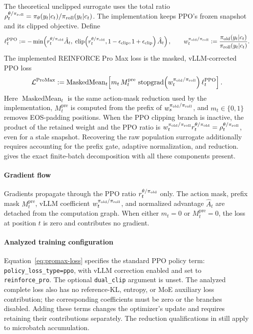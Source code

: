 The theoretical unclipped surrogate uses the total ratio
$\rho_t^{\theta/\pi_{\mathrm{roll}}}=\pi_{\theta}(y_t|c_t)/\pi_{\mathrm{roll}}(y_t|c_t)$. The
implementation keeps PPO's frozen snapshot and its clipped objective. Define
\begin{equation*}
    \ell_t^{\mathrm{PPO}}
    :=
    -\min\!\left(
        r_t^{\theta/\pi_{\mathrm{old}}}\hat A_t,\;
        \operatorname{clip}\!\left(r_t^{\theta/\pi_{\mathrm{old}}},
        1-\epsilon_{\mathrm{clip}},1+\epsilon_{\mathrm{clip}}\right)\hat A_t
    \right),
    \qquad
    w_t^{\pi_{\mathrm{old}}/\pi_{\mathrm{roll}}}
    :=
    \frac{\pi_{\mathrm{old}}(y_t|c_t)}{\pi_{\mathrm{roll}}(y_t|c_t)}.
\end{equation*}
The implemented REINFORCE Pro Max loss is the masked, vLLM-corrected PPO
loss
\begin{equation}
    \mathcal{L}^{\mathrm{ProMax}}
    := \operatorname{MaskedMean}_{t}\!
    \left[m_t\,M_t^{\mathrm{pre}}\,
    \operatorname{stopgrad}\!\left(w_t^{\pi_{\mathrm{old}}/\pi_{\mathrm{roll}}}\right)
    \ell_t^{\mathrm{PPO}}\right].
    \label{eq:promax-loss}
\end{equation}
Here $\operatorname{MaskedMean}_{t}$ is the same action-mask reduction used
by the implementation, $M_t^{\mathrm{pre}}$ is computed from the prefix of
$w_s^{\pi_{\mathrm{old}}/\pi_{\mathrm{roll}}}$, and $m_t\in\{0,1\}$ removes EOS-padding positions.
When the PPO clipping branch is inactive, the product of the retained weight and the PPO ratio is
$w_t^{\pi_{\mathrm{old}}/\pi_{\mathrm{roll}}}r_t^{\theta/\pi_{\mathrm{old}}}=\rho_t^{\theta/\pi_{\mathrm{roll}}}$, even for a stale snapshot.
Recovering the raw population surrogate additionally requires accounting for the prefix gate, adaptive normalization, and reduction.
 gives the exact finite-batch decomposition with all these components present.

\paragraph{Gradient flow} Gradients propagate through the PPO ratio
$r_t^{\theta/\pi_{\mathrm{old}}}$ only. The action mask, prefix mask
$M_t^{\mathrm{pre}}$, vLLM coefficient $w_t^{\pi_{\mathrm{old}}/\pi_{\mathrm{roll}}}$, and normalized
advantage $\hat A_t$ are detached from the computation graph. When either
$m_t=0$ or $M_t^{\mathrm{pre}}=0$, the loss at position $t$ is zero and contributes
no gradient.

\paragraph{Analyzed training configuration}
Equation~\eqref{eq:promax-loss} specifies the standard PPO policy term:
\texttt{policy\_loss\_type=ppo}, with vLLM correction enabled and
 set to \texttt{reinforce\_pro}.
The optional \texttt{dual\_clip} argument is unset. The analyzed complete
loss also has no reference-KL, entropy, or MoE auxiliary loss contribution;
the corresponding coefficients must be zero or the branches disabled.
Adding these terms changes the optimizer's update and requires retaining
their contributions separately. The reduction qualifications in
 still apply to microbatch accumulation.

